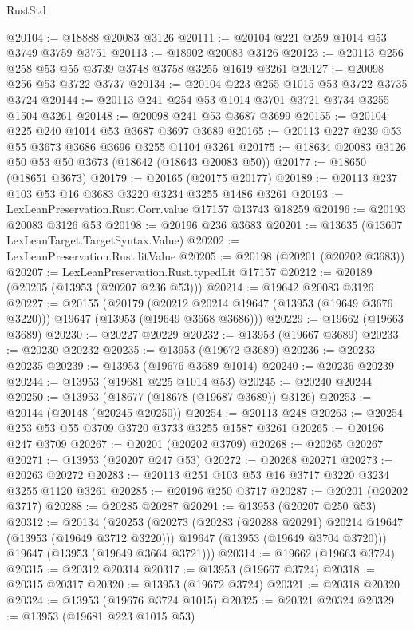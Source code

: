 \begin{lexlean}{RustStd}
\begin{coremodule}
@20104 := @18888 @20083 @3126
@20111 := @20104 @221 @259 @1014 @53 @3749 @3759 @3751
@20113 := @18902 @20083 @3126
@20123 := @20113 @256 @258 @53 @55 @3739 @3748 @3758 @3255 @1619 @3261
@20127 := @20098 @256 @53 @3722 @3737
@20134 := @20104 @223 @255 @1015 @53 @3722 @3735 @3724
@20144 := @20113 @241 @254 @53 @1014 @3701 @3721 @3734 @3255 @1504 @3261
@20148 := @20098 @241 @53 @3687 @3699
@20155 := @20104 @225 @240 @1014 @53 @3687 @3697 @3689
@20165 := @20113 @227 @239 @53 @55 @3673 @3686 @3696 @3255 @1104 @3261
@20175 := @18634 @20083 @3126 @50 @53 @50 @3673 (@18642 (@18643 @20083 @50))
@20177 := @18650 (@18651 @3673)
@20179 := @20165 (@20175 @20177)
@20189 := @20113 @237 @103 @53 @16 @3683 @3220 @3234 @3255 @1486 @3261
@20193 := LexLeanPreservation.Rust.Corr.value @17157 @13743 @18259
@20196 := @20193 @20083 @3126 @53
@20198 := @20196 @236 @3683
@20201 := @13635 (@13607 LexLeanTarget.TargetSyntax.Value)
@20202 := LexLeanPreservation.Rust.litValue
@20205 := @20198 (@20201 (@20202 @3683))
@20207 := LexLeanPreservation.Rust.typedLit @17157
@20212 := @20189 (@20205 (@13953 (@20207 @236 @53)))
@20214 := @19642 @20083 @3126
@20227 := @20155
    (@20179
      (@20212 @20214 @19647 (@13953 (@19649 @3676 @3220)))
      @19647
      (@13953 (@19649 @3668 @3686)))
@20229 := @19662 (@19663 @3689)
@20230 := @20227 @20229
@20232 := @13953 (@19667 @3689)
@20233 := @20230 @20232
@20235 := @13953 (@19672 @3689)
@20236 := @20233 @20235
@20239 := @13953 (@19676 @3689 @1014)
@20240 := @20236 @20239
@20244 := @13953 (@19681 @225 @1014 @53)
@20245 := @20240 @20244
@20250 := @13953 (@18677 (@18678 (@19687 @3689)) @3126)
@20253 := @20144 (@20148 (@20245 @20250))
@20254 := @20113 @248
@20263 := @20254 @253 @53 @55 @3709 @3720 @3733 @3255 @1587 @3261
@20265 := @20196 @247 @3709
@20267 := @20201 (@20202 @3709)
@20268 := @20265 @20267
@20271 := @13953 (@20207 @247 @53)
@20272 := @20268 @20271
@20273 := @20263 @20272
@20283 := @20113 @251 @103 @53 @16 @3717 @3220 @3234 @3255 @1120 @3261
@20285 := @20196 @250 @3717
@20287 := @20201 (@20202 @3717)
@20288 := @20285 @20287
@20291 := @13953 (@20207 @250 @53)
@20312 := @20134
    (@20253
      (@20273
        (@20283 (@20288 @20291) @20214 @19647 (@13953 (@19649 @3712 @3220)))
        @19647
        (@13953 (@19649 @3704 @3720)))
      @19647
      (@13953 (@19649 @3664 @3721)))
@20314 := @19662 (@19663 @3724)
@20315 := @20312 @20314
@20317 := @13953 (@19667 @3724)
@20318 := @20315 @20317
@20320 := @13953 (@19672 @3724)
@20321 := @20318 @20320
@20324 := @13953 (@19676 @3724 @1015)
@20325 := @20321 @20324
@20329 := @13953 (@19681 @223 @1015 @53)

\end{coremodule}
\end{lexlean}
